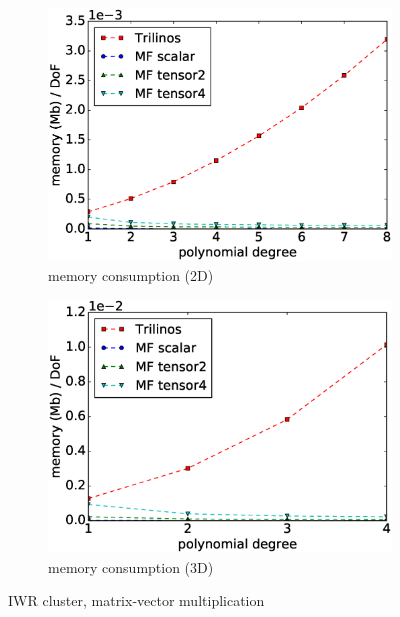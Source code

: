\documentclass[times,doublespace]{nmeauth}
\begin{document}
\begin{figure}[!ht]
\begin{subfigure}[b]{0.49\textwidth}
      \includegraphics[width=\textwidth]{IWR_memory2d.eps}
      \caption{memory consumption (2D)}
      \label{fig:benchmark_miehe_IWR_memory2}
  \end{subfigure}
  \begin{subfigure}[b]{0.49\textwidth}
    \centering
    \includegraphics[width=\textwidth]{IWR_memory3d.eps}
    \caption{memory consumption (3D)}
    \label{fig:benchmark_miehe_IWR_memory3}
  \end{subfigure}
  \caption{IWR cluster, matrix-vector multiplication}%
  \label{fig:benchmark_miehe_IWR}
\end{figure}
\end{document}
